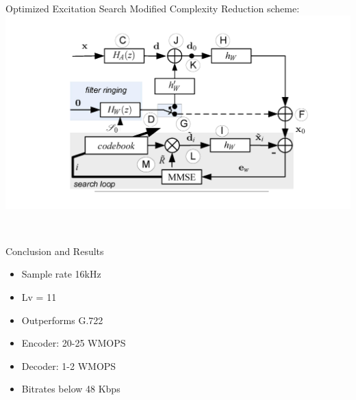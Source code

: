 \documentclass[10pt]{beamer}
\begin{document}
  \begin{frame}{Optimized Excitation Search Modified}
    Complexity Reduction scheme:\\
      \includegraphics[width=\linewidth]{./img/closed_loop_scheme_complex.png}


      \vspace{10pt}
      \begin{figure}
        \begin{minipage}{\textwidth}
                 \\
        \end{minipage}
    \end{figure}
  \end{frame}



  \begin{frame}{Conclusion and Results}
    \begin{itemize}
      \item Sample rate 16kHz
      \item Lv = 11
      \item Outperforms G.722
      \item Encoder: 20-25 WMOPS
      \item Decoder: 1-2 WMOPS
      \item Bitrates below 48 Kbps
    \end{itemize}
  \end{frame}
\end{document}
